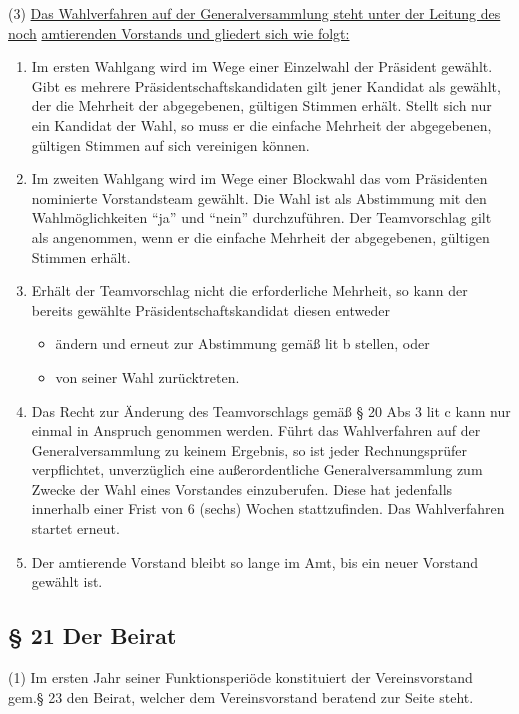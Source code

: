 \documentclass[11pt,a4paper]{article}
\begin{document}
(3)
\underline{Das Wahlverfahren auf der Generalversammlung steht unter der Leitung des noch}
\underline{amtierenden Vorstands und gliedert sich wie folgt:}

\begin{enumerate}[label=\alph*)]
\item
Im ersten Wahlgang wird im Wege einer Einzelwahl der Präsident gewählt.
Gibt es mehrere Präsidentschaftskandidaten gilt jener Kandidat als gewählt, der die Mehrheit der abgegebenen, gültigen Stimmen erhält.
Stellt sich nur ein Kandidat der Wahl, so muss er die einfache Mehrheit der abgegebenen, gültigen Stimmen auf sich vereinigen können.
\item
Im zweiten Wahlgang wird im Wege einer Blockwahl das vom Präsidenten nominierte Vorstandsteam gewählt.
Die Wahl ist als Abstimmung mit den Wahlmöglichkeiten "`ja"' und "`nein"' durchzuführen.
Der Teamvorschlag gilt als angenommen, wenn er die einfache Mehrheit der abgegebenen, gültigen Stimmen erhält.
\item
Erhält der Teamvorschlag nicht die erforderliche Mehrheit, so kann der bereits gewählte Präsidentschaftskandidat diesen entweder
	\begin{itemize}
	\renewcommand\labelitemi{-}
	\item
	ändern und erneut zur Abstimmung gemäß lit b stellen, oder
	\item
	von seiner Wahl zurücktreten.
	\end{itemize}
\item
Das Recht zur Änderung des Teamvorschlags gemäß § 20 Abs 3 lit c kann nur einmal in Anspruch genommen werden.
Führt das Wahlverfahren auf der Generalversammlung zu keinem Ergebnis, so ist jeder Rechnungsprüfer verpflichtet, unverzüglich eine außerordentliche Generalversammlung zum Zwecke der Wahl eines Vorstandes einzuberufen.
Diese hat jedenfalls innerhalb einer Frist von 6 (sechs) Wochen stattzufinden.
Das Wahlverfahren startet erneut.
\item
Der amtierende Vorstand bleibt so lange im Amt, bis ein neuer Vorstand gewählt ist.
\end{enumerate}

\subsection{§ 21
Der Beirat}

(1)
Im ersten Jahr seiner Funktionsperiöde konstituiert der Vereinsvorstand gem.§ 23 den Beirat, welcher dem Vereinsvorstand beratend zur Seite steht.
\end{document}
